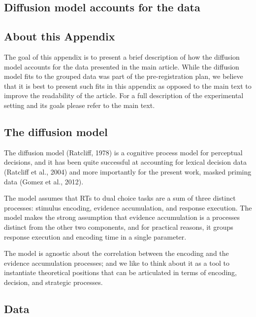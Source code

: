\documentclass[
  english,
  man,floatsintext]{apa6}
\begin{document}
\begin{appendix}
\hypertarget{diffusion-model-accounts-for-the-data}{%
\section{Diffusion model accounts for the
data}\label{diffusion-model-accounts-for-the-data}}

\hypertarget{about-this-appendix}{%
\subsection{About this Appendix}\label{about-this-appendix}}

The goal of this appendix is to present a brief description of how the
diffusion model accounts for the data presented in the main article.
While the diffusion model fits to the grouped data was part of the
pre-registration plan, we believe that it is best to present such fits
in this appendix as opposed to the main text to improve the readability
of the article. For a full description of the experimental setting and
its goals please refer to the main text.

\hypertarget{the-diffusion-model}{%
\subsection{The diffusion model}\label{the-diffusion-model}}

The diffusion model (Ratcliff, 1978) is a cognitive process model for
perceptual decisions, and it has been quite successful at accounting for
lexical decision data (Ratcliff et al., 2004) and more importantly for
the present work, masked priming data (Gomez et al., 2012).

The model assumes that RTs to dual choice tasks are a sum of three
distinct processes: stimulus encoding, evidence accumulation, and
response execution. The model makes the strong assumption that evidence
accumulation is a processes distinct from the other two components, and
for practical reasons, it groups response execution and encoding time in
a single parameter.

The model is agnostic about the correlation between the encoding and the
evidence accumulation processes; and we like to think about it as a tool
to instantiate theoretical positions that can be articulated in terms of
encoding, decision, and strategic processes.

\hypertarget{data}{%
\subsection{Data}\label{data}}


\end{appendix}
\end{document}
